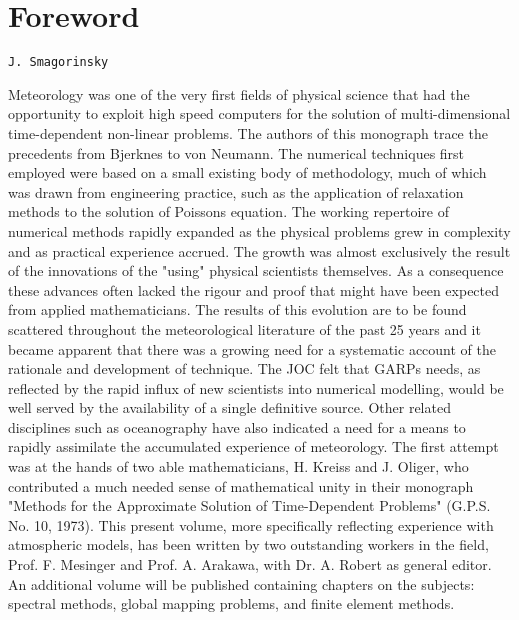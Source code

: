 \section{Foreword}\label{foreword}

\texttt{J.\ Smagorinsky}

Meteorology was one of the very first fields of physical science that
had the opportunity to exploit high speed computers for the solution of
multi-dimensional time-dependent non-linear problems. The authors of
this monograph trace the precedents from Bjerknes to von Neumann. The
numerical techniques first employed were based on a small existing body
of methodology, much of which was drawn from engineering practice, such
as the application of relaxation methods to the solution of
Poisson\textquotesingle s equation. The working repertoire of numerical
methods rapidly expanded as the physical problems grew in complexity and
as practical experience accrued. The growth was almost exclusively the
result of the innovations of the "using" physical scientists themselves.
As a consequence these advances often lacked the rigour and proof that
might have been expected from applied mathematicians. The results of
this evolution are to be found scattered throughout the meteorological
literature of the past 25 years and it became apparent that there was a
growing need for a systematic account of the rationale and development
of technique. The JOC felt that GARP\textquotesingle s needs, as
reflected by the rapid influx of new scientists into numerical
modelling, would be well served by the availability of a single
definitive source. Other related disciplines such as oceanography have
also indicated a need for a means to rapidly assimilate the accumulated
experience of meteorology. The first attempt was at the hands of two
able mathematicians, H. Kreiss and J. Oliger, who contributed a much
needed sense of mathematical unity in their monograph "Methods for the
Approximate Solution of Time-Dependent Problems" (G.P.S. No. 10, 1973).
This present volume, more specifically reflecting experience with
atmospheric models, has been written by two outstanding workers in the
field, Prof. F. Mesinger and Prof. A. Arakawa, with Dr. A. Robert as
general editor. An additional volume will be published containing
chapters on the subjects: spectral methods, global mapping problems, and
finite element methods.
